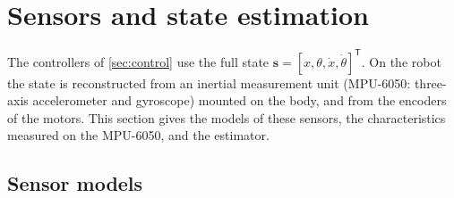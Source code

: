 \section{Sensors and state estimation}\label{sec:est}

The controllers of \cref{sec:control} use the full state
$\bm s = [x, \theta, \dot x, \dot\theta]^{\mathsf T}$. On the robot the state is
reconstructed from an inertial measurement unit (MPU-6050: three-axis
accelerometer and gyroscope) mounted on the body, and from the encoders of the
motors. This section gives the models of these sensors, the characteristics
measured on the MPU-6050, and the estimator.

\subsection{Sensor models}

